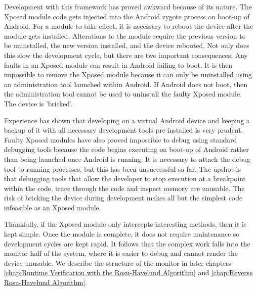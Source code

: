 Development with this framework has proved awkward because of its nature.  The Xposed module code gets injected into the Android zygote process on boot-up of Android.  For a module to take effect, it is necessary to reboot the device after the module gets installed.  Alterations to the module require the previous version to be uninstalled, the new version installed, and the device rebooted.  Not only does this slow the development cycle, but there are two important consequences:  Any faults in an Xposed module can result in Android failing to boot.  It is then impossible to remove the Xposed module because it can only be uninstalled using an administration tool launched within Android.  If Android does not boot, then the administration tool cannot be used to uninstall the faulty Xposed module.  The device is 'bricked'.

Experience has shown that developing on a virtual Android device and keeping a backup of it with all necessary development tools pre-installed is very prudent.  Faulty Xposed modules have also proved impossible to debug using standard debugging tools because the code begins executing on boot-up of Android rather than being launched once Android is running.  It is necessary to attach the debug tool to running processes, but this has been unsuccessful so far.  The upshot is that debugging tools that allow the developer to stop execution at a breakpoint within the code, trace through the code and inspect memory are unusable.  The risk of bricking the device during development makes all but the simplest code infeasible as an Xposed module.

Thankfully, if the Xposed module only intercepts interesting methods, then it is kept simple.  Once the module is complete, it does not require maintenance so development cycles are kept rapid.  It follows that the complex work falls into the monitor half of the system, where it is easier to debug and cannot render the device unusable.  We describe the structure of the monitor in later chapters \ref{chap:Runtime Verification with the Rosu-Havelund Algorithm} and \ref{chap:Reverse Rosu-Havelund Algorithm}.
